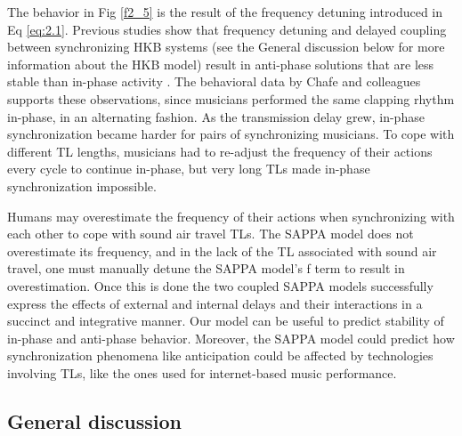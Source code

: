 \documentclass{report}
\begin{document}
The behavior in Fig \ref{f2_5} is the result of the frequency detuning introduced in Eq \eqref{eq:2.1}. Previous studies show that frequency detuning and delayed coupling between synchronizing HKB systems (see the General discussion below for more information about the HKB model) result in anti-phase solutions that are less stable than in-phase activity \cite{slowinski2016effects, avitabile2016beyond}. The behavioral data by Chafe and colleagues\cite{chafe2010effect} supports these observations, since musicians performed the same clapping rhythm in-phase, in an alternating fashion. As the transmission delay grew, in-phase synchronization became harder for pairs of synchronizing musicians. To cope with different TL lengths, musicians had to re-adjust the frequency of their actions every cycle to continue in-phase, but very long TLs made in-phase synchronization impossible.

Humans may overestimate the frequency of their actions when synchronizing with each other to cope with sound air travel TLs. The SAPPA model does not overestimate its frequency, and in the lack of the TL associated with sound air travel, one must manually detune the SAPPA model’s f term to result in overestimation. Once this is done the two coupled SAPPA models successfully express the effects of external and internal delays and their interactions in a succinct and integrative manner. Our model can be useful to predict stability of in-phase and anti-phase behavior. Moreover, the SAPPA model could predict how synchronization phenomena like anticipation could be affected by technologies involving TLs, like the ones used for internet-based music performance.

\subsection{General discussion}
\end{document}

